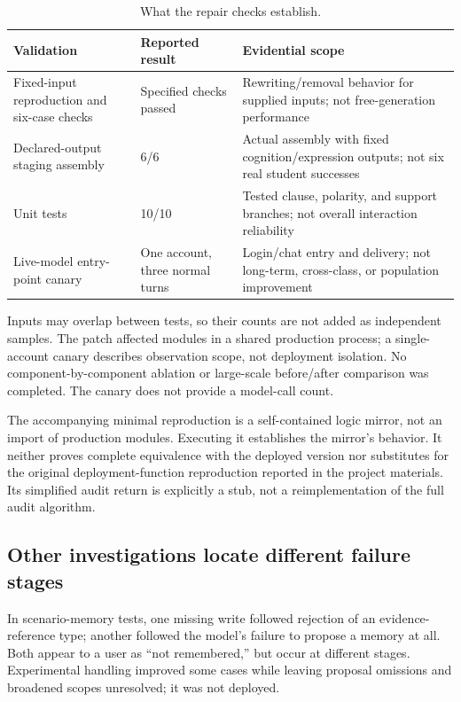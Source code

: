 \documentclass[11pt,a4paper]{article}
\begin{document}
\begin{table}[htbp]
\centering\small
\caption{What the repair checks establish.}\label{tab:tests}
\begin{tabular}{P{.25\linewidth}P{.20\linewidth}P{.45\linewidth}}
\toprule
Validation & Reported result & Evidential scope \\
\midrule
Fixed-input reproduction and six-case checks & Specified checks passed & Rewriting/removal behavior for supplied inputs; not free-generation performance \\
Declared-output staging assembly & 6/6 & Actual assembly with fixed cognition/expression outputs; not six real student successes \\
Unit tests & 10/10 & Tested clause, polarity, and support branches; not overall interaction reliability \\
Live-model entry-point canary & One account, three normal turns & Login/chat entry and delivery; not long-term, cross-class, or population improvement \\
\bottomrule
\end{tabular}
\end{table}

Inputs may overlap between tests, so their counts are not added as independent samples. The patch affected modules in a shared production process; a single-account canary describes observation scope, not deployment isolation. No component-by-component ablation or large-scale before/after comparison was completed. The canary does not provide a model-call count.

The accompanying minimal reproduction is a self-contained logic mirror, not an import of production modules. Executing it establishes the mirror's behavior. It neither proves complete equivalence with the deployed version nor substitutes for the original deployment-function reproduction reported in the project materials. Its simplified audit return is explicitly a stub, not a reimplementation of the full audit algorithm.

\subsection{Other investigations locate different failure stages}
In scenario-memory tests, one missing write followed rejection of an evidence-reference type; another followed the model's failure to propose a memory at all. Both appear to a user as ``not remembered,'' but occur at different stages. Experimental handling improved some cases while leaving proposal omissions and broadened scopes unresolved; it was not deployed.
\end{document}
